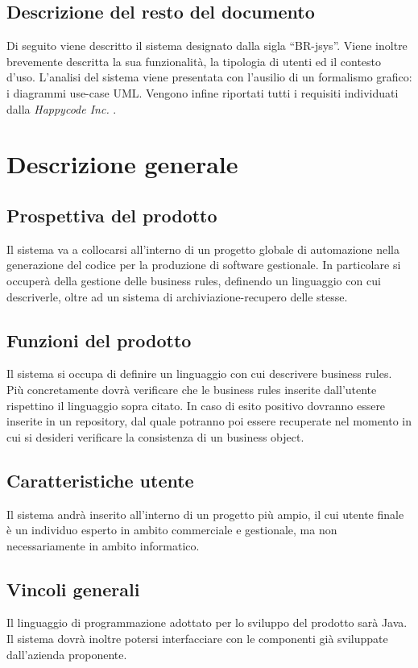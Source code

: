 \documentclass[11pt,titlepage,a4paper]{report}
\begin{document}
\section{Descrizione del resto del documento}
Di seguito viene descritto il sistema designato dalla sigla ``BR-jsys''. Viene inoltre brevemente descritta la sua funzionalit\`a, la tipologia di utenti ed il contesto d'uso. L'analisi del sistema viene presentata con l'ausilio di un formalismo grafico: i diagrammi use-case UML. Vengono infine riportati tutti i requisiti individuati dalla \textit{Happycode Inc.} .

\chapter{Descrizione generale}
\section{Prospettiva del prodotto}
Il sistema va a collocarsi all'interno di un progetto globale di automazione nella generazione del codice per la produzione di software gestionale. In particolare si occuper\`a della gestione delle business rules, definendo un linguaggio con cui descriverle, oltre ad un sistema di archiviazione-recupero delle stesse.
\section{Funzioni del prodotto}
Il sistema si occupa di definire un linguaggio con cui descrivere business rules. Pi\`u concretamente dovr\`a verificare che le business rules inserite dall'utente rispettino il linguaggio sopra citato. In caso di esito positivo dovranno essere inserite in un repository, dal quale potranno poi essere recuperate nel momento in cui si desideri verificare la consistenza di un business object.
\section{Caratteristiche utente}
Il sistema andr\`a inserito all'interno di un progetto pi\`u ampio, il cui utente finale \`e un individuo esperto in ambito commerciale e gestionale, ma non necessariamente in ambito informatico.
\section{Vincoli generali}
Il linguaggio di programmazione adottato per lo sviluppo del prodotto sar\`a Java. Il sistema dovr\`a inoltre potersi interfacciare con le componenti gi\`a sviluppate dall'azienda proponente. 
\end{document}
